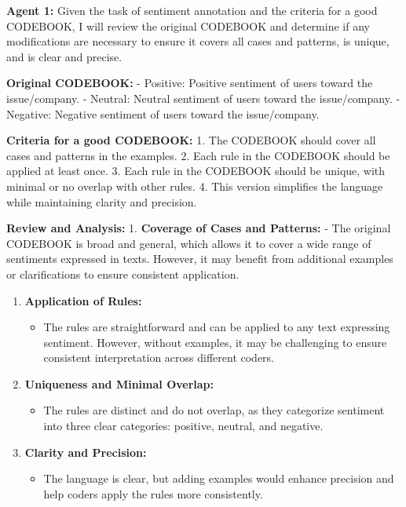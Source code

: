 \textbf{Agent 1:} Given the task of sentiment annotation and the criteria for a
good CODEBOOK, I will review the original CODEBOOK and determine if any
modifications are necessary to ensure it covers all cases and patterns,
is unique, and is clear and precise.

\textbf{Original CODEBOOK:} - Positive: Positive sentiment of users
toward the issue/company. - Neutral: Neutral sentiment of users toward
the issue/company. - Negative: Negative sentiment of users toward the
issue/company.

\textbf{Criteria for a good CODEBOOK:} 1. The CODEBOOK should cover all
cases and patterns in the examples. 2. Each rule in the CODEBOOK should
be applied at least once. 3. Each rule in the CODEBOOK should be unique,
with minimal or no overlap with other rules. 4. This version simplifies
the language while maintaining clarity and precision.

\textbf{Review and Analysis:} 1. \textbf{Coverage of Cases and
Patterns:} - The original CODEBOOK is broad and general, which allows it
to cover a wide range of sentiments expressed in texts. However, it may
benefit from additional examples or clarifications to ensure consistent
application.

\begin{enumerate}
\def\labelenumi{\arabic{enumi}.}
\setcounter{enumi}{1}
\tightlist
\item
  \textbf{Application of Rules:}

  \begin{itemize}
  \tightlist
  \item
    The rules are straightforward and can be applied to any text
    expressing sentiment. However, without examples, it may be
    challenging to ensure consistent interpretation across different
    coders.
  \end{itemize}
\item
  \textbf{Uniqueness and Minimal Overlap:}

  \begin{itemize}
  \tightlist
  \item
    The rules are distinct and do not overlap, as they categorize
    sentiment into three clear categories: positive, neutral, and
    negative.
  \end{itemize}
\item
  \textbf{Clarity and Precision:}

  \begin{itemize}
  \tightlist
  \item
    The language is clear, but adding examples would enhance precision
    and help coders apply the rules more consistently.
  \end{itemize}
\end{enumerate}


